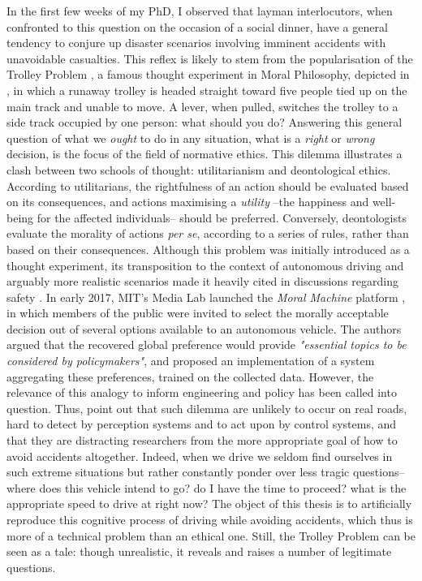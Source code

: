 In the first few weeks of my PhD, I observed that layman interlocutors, when confronted to this question on the occasion of a social dinner, have a general tendency to conjure up disaster scenarios involving imminent accidents with unavoidable casualties. This reflex is likely to stem from the popularisation of the Trolley Problem \citep{Foot1967}, a famous thought experiment in Moral Philosophy, depicted in , in which a runaway trolley is headed straight toward five people tied up on the main track and unable to move. A lever, when pulled, switches the trolley to a side track occupied by one person: what should you do? Answering this general question of what we \emph{ought} to do in any situation, what is a \emph{right} or \emph{wrong} decision, is the focus of the field of {normative ethics}. This dilemma illustrates a clash between two schools of thought: utilitarianism and deontological ethics. According to utilitarians, the rightfulness of an action should be evaluated based on its consequences, and actions maximising a \emph{utility} --the happiness and well-being for the affected individuals-- should be preferred. Conversely, deontologists evaluate the morality of actions \emph{per se}, according to a series of rules, rather than based on their consequences. Although this problem was initially introduced as a thought experiment, its transposition to the context of autonomous driving and arguably more realistic scenarios made it heavily cited in discussions regarding safety \citep[e.g.][]{Lin2015,Bonnefon2016,Gogoll2017}. In early 2017, MIT’s Media Lab launched the \emph{Moral Machine} platform \citep{Awad2018}, in which members of the public were invited to select the morally acceptable decision out of several options available to an autonomous vehicle. The authors argued that the recovered global preference would provide \emph{"essential topics to be considered by policymakers"}, and \citep{Noothigattu2018} proposed an implementation of a system aggregating these preferences, trained on the collected data. However, the relevance of this analogy to inform engineering and policy has been called into question. Thus, \citet{DeFreitas2019} point out that such dilemma are unlikely to occur on real roads, hard to detect by perception systems and to act upon by control systems, and that they are distracting researchers from the more appropriate goal of how to avoid accidents altogether. Indeed, when we drive we seldom find ourselves in such extreme situations but rather constantly ponder over less tragic questions-- where does this vehicle intend to go? do I have the time to proceed? what is the appropriate speed to drive at right now? The object of this thesis is to artificially reproduce this cognitive process of driving while avoiding accidents, which thus is more of a technical problem than an ethical one. Still, the Trolley Problem can be seen as a tale: though unrealistic, it reveals and raises a number of legitimate questions.
